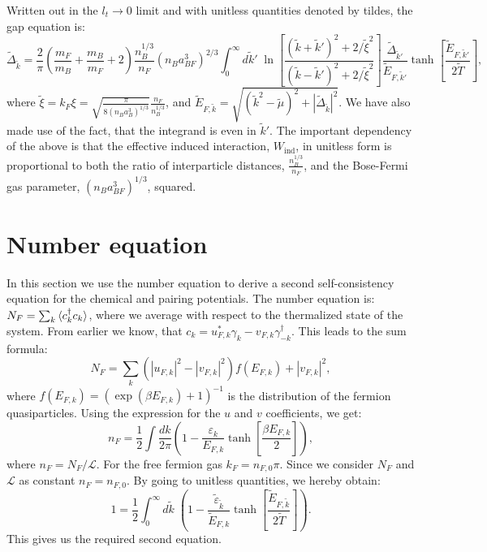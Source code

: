 Written out in the $l_t \to 0$ limit and with unitless quantities denoted by tildes, the gap equation is:
\begin{equation}
\tilde{\Delta}_{\tilde{k}} = \frac{2}{\pi}\left(\frac{m_F}{m_B} + \frac{m_B}{m_F}+ 2\right)\frac{n_B^{1/3}}{n_F}(n_Ba_{BF}^3)^{2/3} \int_0^\infty d\tilde{k}' \; \ln\left[\frac{(\tilde{k}+\tilde{k}')^2+2/\tilde{\xi}^2}{(\tilde{k}-\tilde{k}')^2+2/\tilde{\xi}^2}\right] \frac{\tilde{\Delta}_{\tilde{k}'}}{\tilde{E}_{F,\tilde{k}'}}\tanh\left[\frac{\tilde{E}_{F,\tilde{k}'}}{2\tilde{T}}\right],
\label{eq.GapequationIntegralUnitless}
\end{equation} 
where $\tilde{\xi} = k_F\xi = \sqrt{ \frac{\pi}{ 8(n_Ba_B^3)^{1/3} } } \frac{n_F}{n_B^{1/3}}$, and $\tilde{E}_{F,\tilde{k}} = \sqrt{(\tilde{k}^2-\tilde{\mu})^2 + |\tilde{\Delta}_{\tilde{k}}|^2}$. We have also made use of the fact, that the integrand is even in $\tilde{k}'$. The important dependency of the above is that the effective induced interaction, $W_{\text{ind}}$, in unitless form is proportional to both the ratio of interparticle distances, $\frac{n_B^{1/3}}{n_F}$, and the Bose-Fermi gas parameter, $(n_Ba_{BF}^3)^{1/3}$, squared.

\section{Number equation} \label{sec.chemicalpotential.numberequation}
In this section we use the number equation to derive a second self-consistency equation for the chemical and pairing potentials. The number equation is: $N_F = \sum_k \braket { c_k^\dagger c_k }$, where we average with respect to the thermalized state of the system. From earlier we know, that $c_k = u_{F,k}^* \gamma_k -v_{F,k} \gamma_{-k}^\dagger$. This leads to the sum formula:
\begin{equation}
N_F = \sum_k \left(|u_{F,k}|^2-|v_{F,k}|^2\right) f(E_{F,k}) + |v_{F,k}|^2,\nonumber
\end{equation}
where $f(E_{F,k}) = (\exp(\beta E_{F,k}) + 1)^{-1}$ is the distribution of the fermion quasiparticles. Using the expression for the $u$ and $v$ coefficients, we get:
\begin{equation}
n_F = \frac{1}{2}\int \frac{dk}{2\pi} \left( 1 - \frac{\varepsilon_k}{E_{F,k}}\tanh\left[\frac{\beta E_{F,k}}{2}\right] \right), \nonumber
\end{equation}
where $n_F = N_F/\mathcal{L}$. For the free fermion gas $k_F = n_{F,0}\pi$. Since we consider $N_F$ and $\mathcal{L}$ as constant $n_F = n_{F,0}$. By going to unitless quantities, we hereby obtain:
\begin{equation}
1 = \frac{1}{2}\int_0^\infty d\tilde{k} \; \left( 1 - \frac{\tilde{\varepsilon}_{\tilde{k}}}{\tilde{E}_{F,k}}\tanh\left[\frac{\tilde{E}_{F,\tilde{k}}}{2\tilde{T}}\right] \right). 
\label{eq.NumberEquationUnitless}
\end{equation}
This gives us the required second equation.


